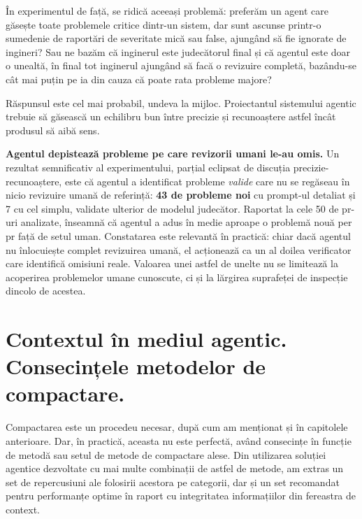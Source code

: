\documentclass[12pt, a4paper, oneside, romanian]{teza-upb}
\begin{document}
    În experimentul de față, se ridică aceeași problemă: preferăm un agent care găsește toate problemele critice dintr-un sistem, dar sunt ascunse printr-o sumedenie de 
    raportări de severitate mică sau false, ajungând să fie ignorate de ingineri? Sau ne bazăm că inginerul este judecătorul final și că agentul este doar o unealtă, în final tot inginerul ajungând să 
    facă o revizuire completă, bazându-se cât mai puțin pe \ac{ia} din cauza că poate rata probleme majore?

    Răspunsul este cel mai probabil, undeva la mijloc. Proiectantul sistemului agentic trebuie să găsească un echilibru bun între precizie și recunoaștere astfel încât produsul să aibă
    sens.

  \textbf{Agentul depistează probleme pe care revizorii umani le-au omis.} Un rezultat semnificativ al experimentului, parțial eclipsat de discuția precizie-recunoaștere, este că
  agentul a identificat probleme \textit{valide} care nu se regăseau în nicio revizuire umană de referință: \textbf{43 de probleme noi} cu prompt-ul detaliat și 7 cu cel simplu, validate ulterior
  de modelul judecător. Raportat la cele 50 de \ac{pr}-uri analizate, înseamnă că agentul a adus în medie aproape o problemă nouă per \ac{pr} față de setul uman. Constatarea este
  relevantă în practică: chiar dacă agentul nu înlocuiește complet revizuirea umană, el acționează ca un al doilea verificator care identifică omisiuni reale. Valoarea unei astfel de
  unelte nu se limitează la acoperirea problemelor umane cunoscute, ci și la lărgirea suprafeței de inspecție dincolo de acestea.

  \newpage

  \section{Contextul în mediul agentic. Consecințele metodelor de compactare.}

  Compactarea este un procedeu necesar, după cum am menționat și în capitolele anterioare. Dar, în practică, aceasta nu este perfectă, având consecințe în funcție de metodă sau setul de metode de compactare alese. 
  Din utilizarea soluției agentice dezvoltate cu mai multe combinații de astfel de metode,
  am extras un set de repercusiuni ale folosirii acestora pe categorii, dar și un set recomandat pentru performanțe optime în raport cu
  integritatea informațiilor din fereastra de context.
\end{document}
